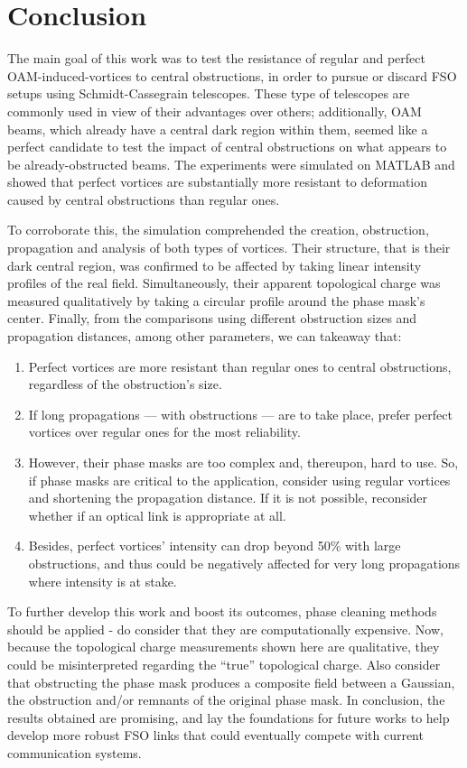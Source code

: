 \chapter{Conclusion} 
\label{Conclusion}

The main goal of this work was to test the resistance of regular and perfect OAM-induced-vortices to central obstructions, in order to pursue or discard FSO setups using Schmidt-Cassegrain telescopes. These type of telescopes are commonly used in view of their advantages over others; additionally, OAM beams, which already have a central dark region within them, seemed like a perfect candidate to test the impact of central obstructions on what appears to be already-obstructed beams. The experiments were simulated on MATLAB and showed that perfect vortices are substantially more resistant to deformation caused by central obstructions than regular ones.

To corroborate this, the simulation comprehended the creation, obstruction, propagation and analysis of both types of vortices. Their structure, that is their dark central region, was confirmed to be affected by taking linear intensity profiles of the real field. Simultaneously, their apparent topological charge was measured qualitatively by taking a circular profile around the phase mask's center. Finally, from the comparisons using different obstruction sizes and propagation distances, among other parameters, we can takeaway that:

\begin{enumerate}
    \item Perfect vortices are more resistant than regular ones to central obstructions, regardless of the obstruction's size.
    \item If long propagations --- with obstructions --- are to take place, prefer perfect vortices over regular ones for the most reliability.
    \item However, their phase masks are too complex and, thereupon, hard to use. So, if phase masks are critical to the application, consider using regular vortices and shortening the propagation distance. If it is not possible, reconsider whether if an optical link is appropriate at all.
    \item Besides, perfect vortices' intensity can drop beyond 50\% with large obstructions, and thus could be negatively affected for very long propagations where intensity is at stake.
\end{enumerate}

To further develop this work and boost its outcomes, phase cleaning methods should be applied - do consider that they are computationally expensive. Now, because the topological charge measurements shown here are qualitative, they could be misinterpreted regarding the ``true'' topological charge. Also consider that obstructing the phase mask produces a composite field between a Gaussian, the obstruction and/or remnants of the original phase mask. In conclusion, the results obtained are promising, and lay the foundations for future works to help develop more robust FSO links that could eventually compete with current communication systems.